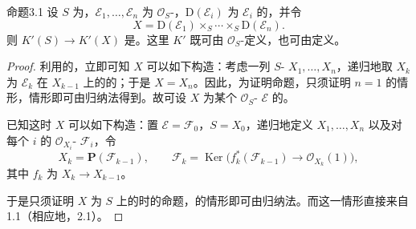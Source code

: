 
\begin{SGAresult}{命题}{3.1}
设 $S$ 为，$\mathcal E_1,\ldots,\mathcal E_n$ 为 $\mathcal O_S$-，$\mathrm D(\mathcal E_i)$ 为 $\mathcal E_i$ 的，并令
\[
X=\mathrm D(\mathcal E_1)\times_S\cdots\times_S\mathrm D(\mathcal E_n).
\]
则 $K'(S)\longrightarrow K'(X)$ 是。这里 $K'$ 既可由 $\mathcal O_S$-定义，也可由定义。
\end{SGAresult}
\begin{proof}
利用的，立即可知 $X$ 可以如下构造：考虑一列 $S$- $X_1,\ldots,X_n$，递归地取 $X_k$ 为 $\mathcal E_k$ 在 $X_{k-1}$ 上的的；于是 $X=X_n$。因此，为证明命题，只须证明 $n=1$ 的情形，情形即可由归纳法得到。故可设 $X$ 为某个 $\mathcal O_S$- $\mathcal E$ 的。

已知这时 $X$ 可以如下构造：置 $\mathcal E=\mathcal F_0$，$S=X_0$，递归地定义 $X_1,\ldots,X_n$ 以及对每个 $i$ 的 $\mathcal O_{X_i}$- $\mathcal F_i$，令
\[
X_k=\mathbf P(\mathcal F_{k-1}),\qquad
\mathcal F_k=\operatorname{Ker}\bigl(f_k^*(\mathcal F_{k-1})\longrightarrow\mathcal O_{X_k}(1)\bigr),
\]
其中 $f_k$ 为 $X_k\longrightarrow X_{k-1}$。

于是只须证明 $X$ 为 $S$ 上的时的命题，的情形即可由归纳法。而这一情形直接来自 1.1（相应地，2.1）。
\end{proof}

